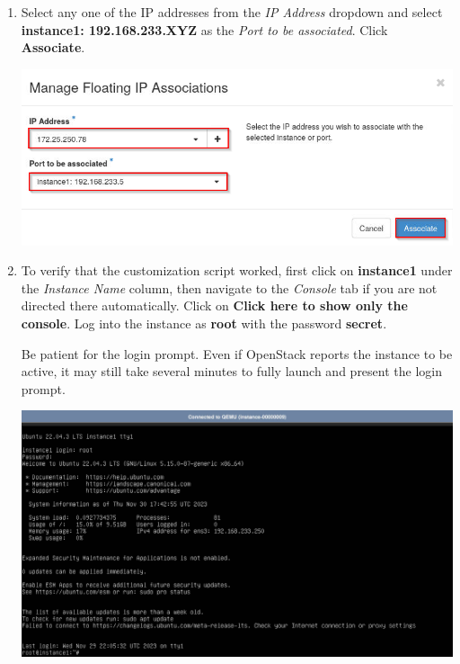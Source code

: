 \documentclass[letterpaper, 12pt]{article}
\begin{document}
\begin{enumerate}
    \item Select any one of the IP addresses from the \textit{IP Address} dropdown and select
    \textbf{instance1: 192.168.233.XYZ} as the \textit{Port to be associated}. Click \textbf{Associate}.

    \begin{center}
        \includegraphics[width=\linewidth]{images/part1/step28.png}
    \end{center}

    \item To verify that the customization script worked, first click on \textbf{instance1} under the
    \textit{Instance Name} column, then navigate to the \textit{Console} tab if you are not directed there
    automatically. Click on \textbf{Click here to show only the console}. Log into the instance as \textbf{root} with
    the password \textbf{secret}.

    \begin{notebox}
        Be patient for the login prompt. Even if OpenStack reports the instance to be active, it may still take several
        minutes to fully launch and present the login prompt.
    \end{notebox}

    \begin{center}
        \includegraphics[width=\linewidth]{images/part1/step29.png}
    \end{center}


\end{enumerate}
\end{document}
